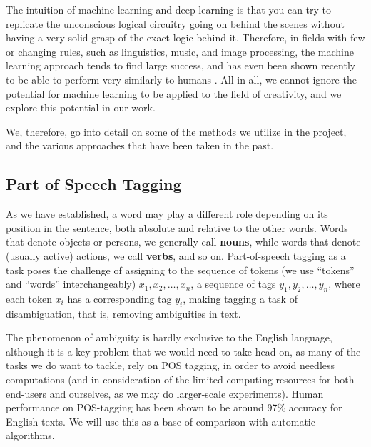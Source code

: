 The intuition of machine learning and deep learning is that you can try to replicate the unconscious logical circuitry going on behind the scenes without having a very solid grasp of the exact logic behind it. Therefore, in fields with few or changing rules, such as linguistics, music, and image processing, the machine learning approach tends to find large success, and has even been shown recently to be able to perform very similarly to humans \citep{bubeck2023sparks}. All in all, we cannot ignore the potential for machine learning to be applied to the field of creativity, and we explore this potential in our work.

We, therefore, go into detail on some of the methods we utilize in the project, and the various approaches that have been taken in the past.

\subsection{Part of Speech Tagging}
As we have established, a word may play a different role depending on its position in the sentence, both absolute and relative to the other words. Words that denote objects or persons, we generally call \textbf{nouns}, while words that denote (usually active) actions, we call \textbf{verbs}, and so on. 
Part-of-speech tagging as a task poses the challenge of assigning to the sequence of tokens (we use ``tokens'' and ``words'' interchangeably) $x_1, x_2, \dots, x_n$, a sequence of tags $y_1, y_2, \dots, y_n$, where each token $x_i$ has a corresponding tag $y_i$, making tagging a task of disambiguation, that is, removing ambiguities in text.

The phenomenon of ambiguity is hardly exclusive to the English language, although it is a key problem that we would need to take head-on, as many of the tasks we do want to tackle, rely on POS tagging, in order to avoid needless computations (and in consideration of the limited computing resources for both end-users and ourselves, as we may do larger-scale experiments). Human performance on POS-tagging has been shown to be around 97\% accuracy \citep{manning2011part} for English texts. We will use this as a base of comparison with automatic algorithms.

